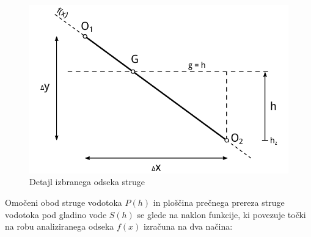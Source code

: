 \begin{figure}[ht!]
	\begin{centering}
		\includegraphics{slike/customChannel/odsek_detajl.pdf}
		\caption{Detajl izbranega odseka struge}\label{fig:custom_odsekDetajl}
	\end{centering}
\end{figure}



Omočeni obod struge vodotoka $P(h)$ in ploščina prečnega prereza struge vodotoka pod gladino vode $S(h)$ se glede na naklon funkcije, ki povezuje točki na robu analiziranega odseka $f(x)$ izračuna na dva načina:

